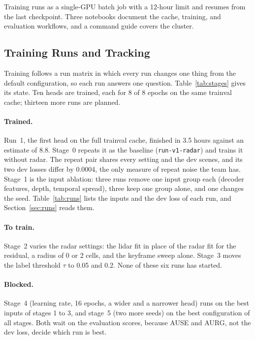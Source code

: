 Training runs as a single-GPU batch job with a 12-hour limit and resumes from the last checkpoint. Three notebooks document the cache, training, and evaluation workflows, and a command guide covers the cluster.

\subsection{Training Runs and Tracking}

Training follows a run matrix in which every run changes one thing from the default configuration, so each run answers one question. Table~\ref{tab:stages} gives its state. Ten heads are trained, each for 8 of 8 epochs on the same trainval cache; thirteen more runs are planned.

\paragraph{Trained.} Run~1, the first head on the full trainval cache, finished in 3.5 hours against an estimate of 8.8. Stage~0 repeats it as the baseline (\texttt{run-v1-radar}) and trains it without radar. The repeat pair shares every setting and the dev scenes, and its two dev losses differ by 0.0004, the only measure of repeat noise the team has. Stage~1 is the input ablation: three runs remove one input group each (decoder features, depth, temporal spread), three keep one group alone, and one changes the seed. Table~\ref{tab:runs} lists the inputs and the dev loss of each run, and Section~\ref{sec:runs} reads them.

\paragraph{To train.} Stage~2 varies the radar settings: the lidar fit in place of the radar fit for the residual, a radius of 0 or 2 cells, and the keyframe sweep alone. Stage~3 moves the label threshold $\tau$ to 0.05 and 0.2. None of these six runs has started.

\paragraph{Blocked.} Stage~4 (learning rate, 16 epochs, a wider and a narrower head) runs on the best inputs of stages 1 to 3, and stage~5 (two more seeds) on the best configuration of all stages. Both wait on the evaluation scores, because AUSE and AURG, not the dev loss, decide which run is best.

